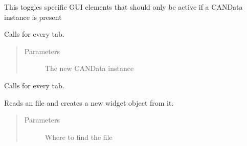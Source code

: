 \documentclass[letterpaper,10pt,english]{sphinxmanual}
\begin{document}
\begin{fulllineitems}
\begin{fulllineitems}
\end{fulllineitems}


\begin{fulllineitems}
\label{\detokenize{src:src.Toolbox.Toolbox.toggleDisabledSenderGUIElements}}
This toggles specific GUI elements that should only be active if a CANData instance is present

\end{fulllineitems}


\begin{fulllineitems}
\label{\detokenize{src:src.Toolbox.Toolbox.updateCANDataInstances}}
Calls  for every tab.
\begin{quote}\begin{description}
\item[{Parameters}] \leavevmode
{} \textendash{} The new CANData instance

\end{description}\end{quote}

\end{fulllineitems}


\begin{fulllineitems}
\label{\detokenize{src:src.Toolbox.Toolbox.updateInterfaceLabels}}
Calls  for every tab.

\end{fulllineitems}


\begin{fulllineitems}
\label{\detokenize{src:src.Toolbox.Toolbox.widgetFromUIFile}}
Reads an  file and creates a new widget object from it.
\begin{quote}\begin{description}
\item[{Parameters}] \leavevmode
{} \textendash{} Where to find the  file


\end{description}
\end{quote}
\end{fulllineitems}
\end{fulllineitems}
\end{document}
